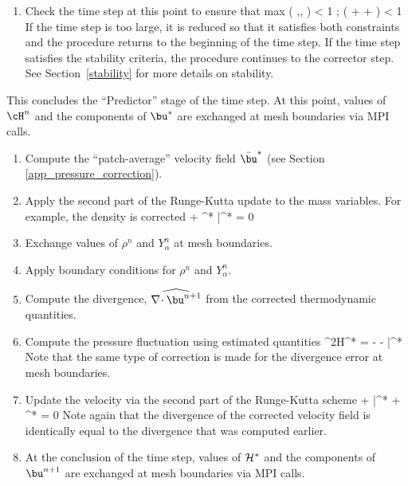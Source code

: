 \begin{enumerate}
\item Check the time step at this point to ensure that
\be \dt \; \hbox{max} \left( ,, \right) < 1 \quad ;  \; \dt \; \nu \; \left( +  +  \right) < 1 \ee
If the time step is too large, it is reduced so that it satisfies both constraints and the procedure returns to the beginning of the time step. If
the time step satisfies the stability criteria, the procedure continues to the corrector step. See Section~\ref{stability} for more details on
stability.
\end{enumerate}

\noindent This concludes the ``Predictor'' stage of the time step.  At this point, values of $\cH^n$ and the components of $\bu^*$ are exchanged at
mesh boundaries via MPI calls.

\begin{enumerate}
\item Compute the ``patch-average'' velocity field $\bar{\bu}^*$ (see Section \ref{app_pressure_correction}).

\item Apply the second part of the Runge-Kutta update to the mass variables. For example, the density is corrected
\be {} +  \nabla\!\cdot \rho^* \bar{\bu}^* = 0 \ee

\item Exchange values of $\rho^n$ and $Y_\alpha^n$ at mesh boundaries.

\item Apply boundary conditions for $\rho^n$ and $Y_\alpha^n$.

\item Compute the divergence, $\widehat{\nabla\!\cdot \bu^{n+1}}$ from the corrected thermodynamic quantities.

\item Compute the pressure fluctuation using estimated quantities
\be \label{eqn_corrector_poisson2} \nabla^2{\cal H}^* = - 
   - \nabla\!\cdot \bar{}^*
\ee Note that the same type of correction is made for the divergence error at mesh boundaries.

\item Update the velocity via the second part of the Runge-Kutta scheme
\be {} + \bar{}^* + ^*  = 0 \ee Note again that the
divergence of the corrected velocity field is identically equal to the divergence that was computed earlier.

\item At the conclusion of the time step, values of $\cal H^*$ and the components of $\bu^{n+1}$ are exchanged at mesh boundaries via MPI calls.

\end{enumerate}
